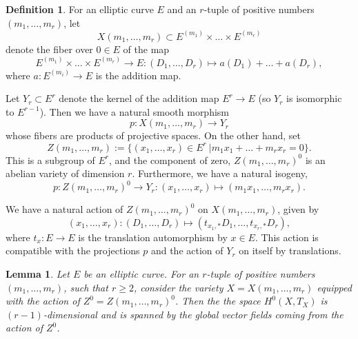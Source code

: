 \documentclass[reqno]{amsart}
\newtheorem{lemma}[theorem]{Lemma}
\theoremstyle{definition}
\newtheorem{definition}[theorem]{Definition}
\theoremstyle{remark}
\newcommand{\sub}{\subset}
\newcommand{\De}{\Delta}
\numberwithin{equation}{section}
\begin{document}
\begin{definition}\label{X-variety-def}
For an elliptic curve $E$ and an $r$-tuple of positive numbers $(m_1,\ldots,m_r)$, let 
$$X(m_1,\ldots,m_r)\sub E^{(m_1)}\times\ldots \times E^{(m_r)}$$ 
denote the fiber over $0\in E$ of the map
$$E^{(m_1)}\times\ldots \times E^{(m_r)}\to E: (D_1,\ldots,D_r)\mapsto a(D_1)+\ldots+a(D_r),$$
where $a:E^{(m_i)}\to E$ is the addition map. 
\end{definition}

Let $Y_r\sub E^r$ denote the kernel of the addition map $E^r\to E$ (so $Y_r$ is isomorphic to $E^{r-1}$). Then we have a natural smooth morphism
$$p:X(m_1,\ldots,m_r)\to Y_r$$
whose fibers are products of projective spaces.
On the other hand, set
$$Z(m_1,\ldots,m_r):=\{(x_1,\ldots,x_r)\in E^r \ | m_1x_1+\ldots+m_rx_r=0\}.$$
This is a subgroup of $E^r$, and the component of zero, $Z(m_1,\ldots,m_r)^0$ is an abelian variety of dimension $r$.
Furthermore, we have a natural isogeny,
$$p:Z(m_1,\ldots,m_r)^0\to Y_r: (x_1,\ldots,x_r)\mapsto (m_1x_1,\ldots,m_rx_r).$$

We have a natural action of $Z(m_1,\ldots,m_r)^0$ on $X(m_1,\ldots,m_r)$, given by 
$$(x_1,\ldots,x_r):(D_1,\ldots,D_r)\mapsto (t_{x_1,*}D_1,\ldots,t_{x_r,*}D_r),$$
where $t_x:E\to E$ is the translation automorphism by $x\in E$. This action is compatible with the projections $p$ and the action of $Y_r$
on itself by translations.

\begin{lemma}\label{tangent-sym-lem}
Let $E$ be an elliptic curve. 
For an $r$-tuple of positive numbers $(m_1,\ldots,m_r)$, such that $r\ge 2$, consider the variety $X=X(m_1,\ldots,m_r)$ equipped with the action of $Z^0=Z(m_1,\ldots,m_r)^0$.
Then the the space $H^0(X,T_X)$ is $(r-1)$-dimensional and is spanned by the global vector fields coming from the action of $Z^0$.
\end{lemma}
\end{document}
